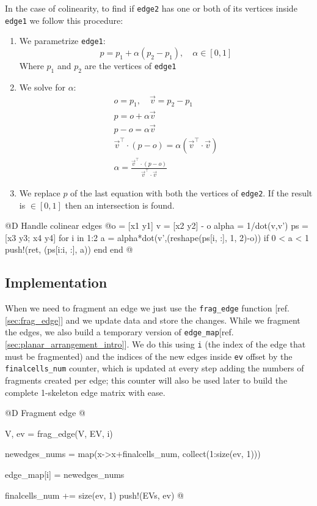 In the case of colinearity, 
to find if \texttt{edge2} has one or both of 
its vertices inside \texttt{edge1} we follow this procedure:
\begin{enumerate}
\item We parametrize \texttt{edge1}:
\[
    p = p_1 + \alpha(p_2-p_1), \quad\alpha\in[0, 1]
\]
Where $p_1$ and $p_2$ are the vertices of \texttt{edge1}
\item We solve for $\alpha$:
\begin{gather*}
    o = p_1, \quad\vec{v} = p_2 - p_1 \\
    p = o + \alpha\vec{v} \\
    p - o = \alpha\vec{v} \\
    \vec{v}^\top\cdot(p-o) = \alpha (\vec{v}^\top\cdot\vec{v}) \\
    \alpha = \frac{\vec{v}^\top\cdot(p-o)}{\vec{v}^\top\cdot\vec{v}}
\end{gather*}
\item We replace $p$ of the last equation with both the vertices of \texttt{edge2}.
If the result is $\in[0,1]$ then an intersection is found.
\end{enumerate} 
@D Handle colinear edges
@{o = [x1 y1] 
v = [x2 y2] - o
alpha = 1/dot(v,v')
ps = [x3 y3; x4 y4]
for i in 1:2
    a = alpha*dot(v',(reshape(ps[i, :], 1, 2)-o))
    if 0 < a < 1
        push!(ret, (ps[i:i, :], a))
    end
end
@}
\subsection{Implementation}

When we need to fragment an edge we just use the \texttt{frag\_edge} function [ref. \ref{sec:frag_edge}]
and we update data and store the changes.
While we fragment the edges, we also build a temporary version of \texttt{edge\_map}[ref. \ref{sec:planar_arrangement_intro}]. We do this using \texttt{i}
(the index of the edge that must be fragmented) and the indices of the new edges inside \texttt{ev}
offset by the \texttt{finalcells\_num} counter, which is updated at every step adding the numbers of
fragments created per edge; this counter will also be used later to build the complete 1-skeleton 
edge matrix with ease.

@D Fragment edge
@{V, ev = frag_edge(V, EV, i)

newedges_nums = map(x->x+finalcells_num, collect(1:size(ev, 1)))

edge_map[i] = newedges_nums

finalcells_num += size(ev, 1)
push!(EVs, ev)
@}

